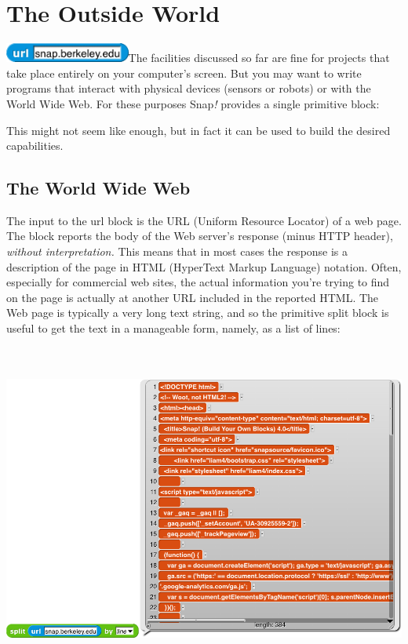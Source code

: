 \section{\texorpdfstring{\hfill\break
The Outside World}{ The Outside World}}\label{the-outside-world}

\includegraphics[width=1.62014in,height=0.25in]{media/image148.png}The
facilities discussed so far are fine for projects that take place
entirely on your computer's screen. But you may want to write programs
that interact with physical devices (sensors or robots) or with the
World Wide Web. For these purposes Snap\emph{!} provides a
\label{url}{}single primitive block:

This might not seem like enough, but in fact it can be used to build the
desired capabilities.

\subsection{The World Wide Web}\label{the-world-wide-web}

The input to the url block is the URL (Uniform Resource Locator) of a
web page. The block reports the body of the Web server's response (minus
HTTP header), \emph{without interpretation.} This means that in most
cases the response is a description of the page in HTML (HyperText
Markup Language) notation. Often, especially for commercial web sites,
the actual information you're trying to find on the page is actually at
another URL included in the reported HTML. The Web page is typically a
very long text string, and so the primitive split block is useful to get
the text in a manageable form, namely, as a list of lines:

\includegraphics[width=6.52083in,height=4.27778in]{media/image871.png}

